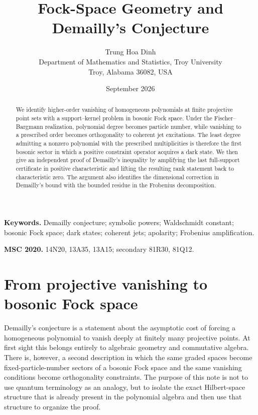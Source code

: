 \documentclass[11pt]{article}
\title{\bfseries Fock-Space Geometry and Demailly's Conjecture}
\author{Trung Hoa Dinh\\
\small Department of Mathematics and Statistics, Troy University\\
\small Troy, Alabama 36082, USA}
\date{September 2026}
\theoremstyle{remark}
\begin{document}
\maketitle

\begin{abstract}
We identify higher-order vanishing of homogeneous polynomials at finite projective point sets with a support--kernel problem in bosonic Fock space.  Under the Fischer--Bargmann realization, polynomial degree becomes particle number, while vanishing to a prescribed order becomes orthogonality to coherent jet excitations.  The least degree admitting a nonzero polynomial with the prescribed multiplicities is therefore the first bosonic sector in which a positive constraint operator acquires a dark state.  We then give an independent proof of Demailly's inequality by amplifying the last full-support certificate in positive characteristic and lifting the resulting rank statement back to characteristic zero.  The argument also identifies the dimensional correction in Demailly's bound with the bounded residue in the Frobenius decomposition.
\end{abstract}

\medskip
\noindent\textbf{Keywords.} Demailly conjecture; symbolic powers; Waldschmidt constant; bosonic Fock space; dark states; coherent jets; apolarity; Frobenius amplification.

\noindent\textbf{MSC 2020.} 14N20, 13A35, 13A15; secondary 81R30, 81Q12.

\section{From projective vanishing to bosonic Fock space}

Demailly's conjecture is a statement about the asymptotic cost of forcing a homogeneous polynomial to vanish deeply at finitely many projective points.  At first sight this belongs entirely to algebraic geometry and commutative algebra.  There is, however, a second description in which the same graded spaces become fixed-particle-number sectors of a bosonic Fock space and the same vanishing conditions become orthogonality constraints.  The purpose of this note is not to use quantum terminology as an analogy, but to isolate the exact Hilbert-space structure that is already present in the polynomial algebra and then use that structure to organize the proof.
\end{document}
